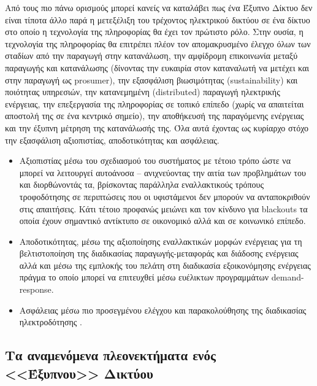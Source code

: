 \documentclass[12pt, a4paper, oneside]{report}
\begin{document}
Από τους πιο πάνω ορισμούς μπορεί κανείς να καταλάβει πως ένα Έξυπνο Δίκτυο δεν είναι τίποτα άλλο παρά η μετεξέλιξη του τρέχοντος ηλεκτρικού δικτύου σε ένα δίκτυο στο οποίο η τεχνολογία της πληροφορίας θα έχει τον πρώτιστο ρόλο. Στην ουσία, η τεχνολογία της πληροφορίας θα επιτρέπει πλέον τον απομακρυσμένο έλεγχο όλων των σταδίων από την παραγωγή στην κατανάλωση, την αμφίδρομη επικοινωνία μεταξύ παραγωγής και κατανάλωσης (δίνοντας την ευκαιρία στον καταναλωτή να μετέχει και στην παραγωγή ως prosumer), την εξασφάλιση βιωσιμότητας (sustainability) και ποιότητας υπηρεσιών, την κατανεμημένη (distributed) παραγωγή ηλεκτρικής ενέργειας, την επεξεργασία της πληροφορίας σε τοπικό επίπεδο (χωρίς να απαιτείται αποστολή της σε ένα κεντρικό σημείο), την αποθήκευσή της παραγόμενης ενέργειας και την έξυπνη μέτρηση της κατανάλωσής της. Όλα αυτά έχοντας ως κυρίαρχο στόχο την εξασφάλιση αξιοπιστίας, αποδοτικότητας και ασφάλειας.
\begin{itemize}
\item Αξιοπιστίας μέσω του σχεδιασμού του συστήματος με τέτοιο τρόπο ώστε να μπορεί να λειτουργεί αυτοάνοσα – ανιχνεύοντας την αιτία των προβλημάτων του και διορθώνοντάς τα, βρίσκοντας παράλληλα εναλλακτικούς τρόπους τροφοδότησης σε περιπτώσεις που οι υφιστάμενοι δεν μπορούν να ανταποκριθούν στις απαιτήσεις. Κάτι τέτοιο προφανώς μειώνει και τον κίνδυνο για blackouts τα οποία έχουν σημαντικό αντίκτυπο σε οικονομικό αλλά και σε κοινωνικό επίπεδο.
\item Αποδοτικότητας, μέσω της αξιοποίησης εναλλακτικών μορφών ενέργειας για τη βελτιστοποίηση της διαδικασίας παραγωγής-μεταφοράς και διάδοσης ενέργειας αλλά και μέσω της εμπλοκής του πελάτη στη διαδικασία εξοικονόμησης ενέργειας πράγμα το οποίο μπορεί να επιτευχθεί μέσω ευέλικτων προγραμμάτων demand-response.
\item Ασφάλειας μέσω πιο προσεγμένου ελέγχου και παρακολούθησης της διαδικασίας ηλεκτροδότησης \cite{11}.
\end{itemize}

\subsection{Τα αναμενόμενα πλεονεκτήματα ενός <<Έξυπνου>> Δικτύου}
\end{document}
